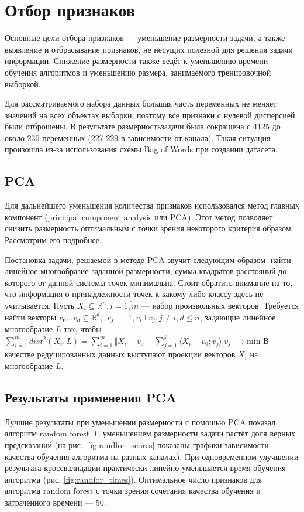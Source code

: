 \section{Отбор признаков}
Основные цели отбора признаков --- уменьшение размерности задачи, а также выявление и отбрасывание признаков,
 не несущих полезной для решения задачи информации. Снижение размерности также ведёт к уменьшению времени обучения алгоритмов и уменьшению размера, занимаемого тренировочной выборкой.
 \par
Для рассматриваемого набора данных большая часть переменных не меняет значений на всех объектах выборки,
 поэтому все признаки с нулевой дисперсией были отброшены. В результате размерностьзадачи была сокращена
 с 4125 до около 230 переменных (227-229 в зависимости от канала). Такая ситуация произошла из-за использования схемы Bag of Words при создании датасета. 
 \subsection{PCA}
 Для дальнейшего уменьшения количества признаков использовался метод главных компонент
 (principal component analysis или PCA). Этот метод позволяет снизить размерность оптимальным с точки зрения некоторого критерия образом. Рассмотрим его подробнее.
 \par
 Постановка задачи, решаемой в методе PCA звучит следующим образом: найти линейное многообразие заданной 
 размерности, сумма квадратов расстояний до которого от данной системы точек минимальна. Стоит обратить внимание на то, что информация о принадлежности точек к какому-либо классу здесь не учитывается.
 Пусть \( X_i \subseteq \mathbb{R}^n, i=\overline{1,m} \) --- набор произвольных векторов. Требуется найти векторы \(v_0\ldots v_d\subseteq \mathbb{R}^d, \Vert v_j \Vert = 1, v_i \bot v_j, j \neq  i, d \leq n\), задающие линейное многообразие \(L\) так, чтобы \(
 \sum_{i=1}^{m} dist^2(X_i, L) = \sum_{i=1}^{m}\Vert X_i - v_0 - \sum_{j=1}^k\langle X_i - v_0; v_j\rangle\ v_j \Vert\rightarrow \mathrm{min}\) В качестве редуцированных данных выступают проекции векторов \( X_i\) на многообразие \(L\). 
 
 
 
 \subsection*{Результаты применения PCA}
 Лучшие результаты при уменьшении размерности с помошью PCA показал алгоритм random forest. С уменьшением размерности задачи растёт доля верных предсказаний (на рис. \ref{fig:randfor_scores} показаны графики 
 зависимости качества обучения алгоритма на разных каналах).
 При одновременном улучшении результата кроссвалидации практически линейно уменьшается время обучения алгоритма (рис. \ref{fig:randfor_times}). Оптимальное число признаков для алгоритма random forest с точки зрения сочетания качества обучения и затраченного времени --- 50.
 
